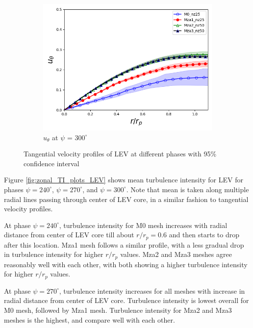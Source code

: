 \begin{figure}[H]
\begin{subfigure}[b]{0.475\textwidth}
	\centering
	\includegraphics[width=1\textwidth]{figures/zonal_adapt_results/LEV/u_theta/phase_300.png}
	\caption{ $u_\theta$ at $\psi$ = $300^\circ$}
	\label{fig:zonal_utheta_300}
	\end{subfigure}
   	\caption{Tangential velocity profiles of LEV at different phases with 95\% confidence interval}
   	\label{fig:zonal_utheta_LEV}
\end{figure}



Figure \ref{fig:zonal_TI_plots_LEV} shows mean turbulence intensity for LEV for phases $\psi = 240^\circ$, $\psi = 270^\circ$, and $\psi = 300^\circ$. 
Note that mean is taken along multiple radial lines passing through center of LEV core, in a similar fashion to tangential velocity profiles.

At phase $\psi = 240^\circ$, turbulence intensity for M0 mesh increases with radial distance from center of LEV core till about $r/r_p = 0.6$ and then starts to drop after this location.
Mza1 mesh follows a similar profile, with a less gradual drop in turbulence intensity for higher $r/r_p $ values.
Mza2 and Mza3 meshes agree reasonably well with each other, with both showing a higher turbulence intensity for higher $r/r_p$ values.


At phase $\psi = 270^\circ$, turbulence intensity increases for all meshes with increase in radial distance from center of LEV core.
Turbulence intensity is lowest overall for M0 mesh, followed by Mza1 mesh. Turbulence intensity for Mza2 and Mza3 meshes is the highest, and compare well with each other.

